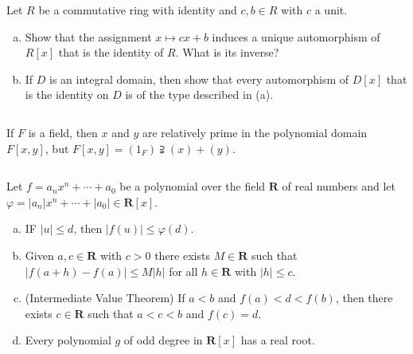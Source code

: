 $$ $$

\begin{ex}
    Let $R$ be a commutative ring with identity and $c,b\in R$ with $c$ a unit.
    \begin{enumerate}[(a)]
        \item Show that the assignment $x\mapsto cx+b$ induces a unique automorphism of $R[x]$ that is the identity of $R$. What is its inverse?
        \item If $D$ is an integral domain, then show that every automorphism of $D[x]$ that is the identity on $D$ is of the type described in (a).
    \end{enumerate}
\end{ex}

$$ $$

\begin{ex}
    If $F$ is a field, then $x$ and $y$ are relatively prime in the polynomial domain $F[x,y]$, but $F[x,y]=(1_{F})\supsetneqq (x)+(y)$.
\end{ex}

$$ $$

\begin{ex}
    Let $f=a_{n}x^{n}+\cdots+a_{0}$ be a polynomial over the field $\mathbf{R}$ of real numbers and let $\varphi=\left| a_{n} \right| x^{n}+\cdots+\left| a_{0} \right| \in\mathbf{R}[x]$.
    \begin{enumerate}[(a)]
        \item IF $\left| u \right| \leq d$, then $\left| f(u) \right| \leq \varphi(d)$.
        \item Given $a,c\in \mathbf{R}$ with $c>0$ there exists $M\in\mathbf{R}$ such that\\ $\left| f(a+h)-f(a) \right| \leq M\left| h \right|  $ for all $h\in \mathbf{R}$ with $\left| h \right| \leq c$.
        \item (Intermediate Value Theorem) If $a<b$ and $f(a)<d<f(b)$, then there exists $c\in \mathbf{R}$ such that $a<c<b$ and $f(c)=d$.
        \item Every polynomial $g$ of odd degree in $\mathbf{R}[x]$ has a real root.
    \end{enumerate}
\end{ex}